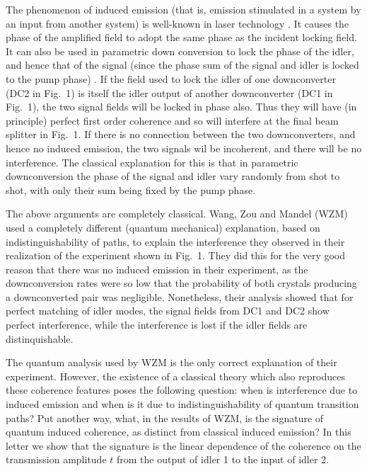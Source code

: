 \begin{multicols}{2}
The phenomenon of induced emission (that is, emission stimulated in a
system by an input from another system) is well-known in laser
technology \cite{injlock}.  It causes the phase of the amplified field to
adopt the same phase as the incident locking field.
It can also be used in parametric down conversion to lock
the phase of the idler, and hence that of the signal (since the phase
sum of the signal and idler is locked to the pump phase) 
\cite{idlerlock}.
If the field used to lock the
idler of one downconverter (DC2 in Fig.~1) is itself the idler output
of another downconverter (DC1 in Fig.~1), the two signal fields 
will be locked in phase also.
Thus they will have (in principle) perfect first order coherence and so
will interfere at the final beam splitter in Fig.~1. If there
is no connection between the two downconverters, and hence no induced
emission, the two signals wil be
incoherent, and there will be no interference. The 
 classical explanation for this is that 
 in parametric downconversion the phase of the signal 
and idler vary  randomly from shot to shot, with only
their sum being fixed by the pump phase.

The above arguments are completely classical.  Wang, Zou and Mandel
\cite{WanZouMan91}
(WZM) used a completely different (quantum mechanical) explanation,
based on indistinguishability of paths, to explain the interference
they observed in their realization of the experiment shown in Fig.~1.
They did this for the very good reason that there was no induced
emission in their experiment, as the downconversion rates were so low
that the probability of both crystals producing a downconverted pair
was negligible.  Nonetheless, their analysis showed that for perfect 
matching of idler modes, the signal fields from DC1
and DC2 show perfect interference, while the interference is lost
if the idler fields are distinquishable.

The quantum analysis used by WZM is the only
correct explanation of their experiment.  However, the existence of a
classical theory which also reproduces these coherence features 
poses the following question: when is interference due to 
induced emission and when
is it due to indistinguishability of quantum transition paths?
Put another way, what, in the results of WZM,
is the signature
of quantum induced coherence, as distinct from classical induced
emission?
In this letter we show that the signature is the linear
dependence of the coherence on the transmission amplitude $t$ from the
output of idler 1 to the input of idler 2.


\end{multicols}
